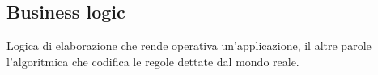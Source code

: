 



\subsection*{Business logic}
Logica di elaborazione che rende operativa un'applicazione, il altre parole l'algoritmica che codifica le regole dettate dal mondo reale.

